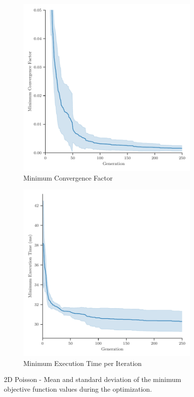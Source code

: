 \begin{figure}
	\centering
	\begin{subfigure}[b]{0.49\textwidth}
		\centering
		\includegraphics[width=\textwidth]{figures/minimum_convergence_factor_2D_FD_Poisson_fromL2.pdf}
		\caption{Minimum Convergence Factor}
		\label{fig:poisson-2D-minimum-convergence-factor}
	\end{subfigure}
	\hfill
	\begin{subfigure}[b]{0.49\textwidth}
		\centering
		\includegraphics[width=\textwidth]{figures/minimum_execution_time_2D_FD_Poisson_fromL2.pdf}
		\caption{Minimum Execution Time per Iteration}
		\label{fig:poisson-2D-minimum-execution-time}
	\end{subfigure}
	\caption{2D Poisson - Mean and standard deviation of the minimum objective function values during the optimization.}
	\label{fig:poisson-2D-minimum-objectives}
\end{figure}
